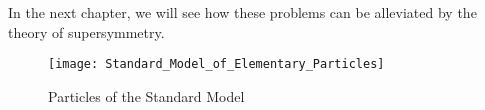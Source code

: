 In the next chapter, we will see how these problems can be alleviated by the theory of supersymmetry.

\begin{figure}
\caption{Particles of the Standard Model} \label{fig:sm_particles}
\texttt{[image: Standard\_Model\_of\_Elementary\_Particles]}
\end{figure}









